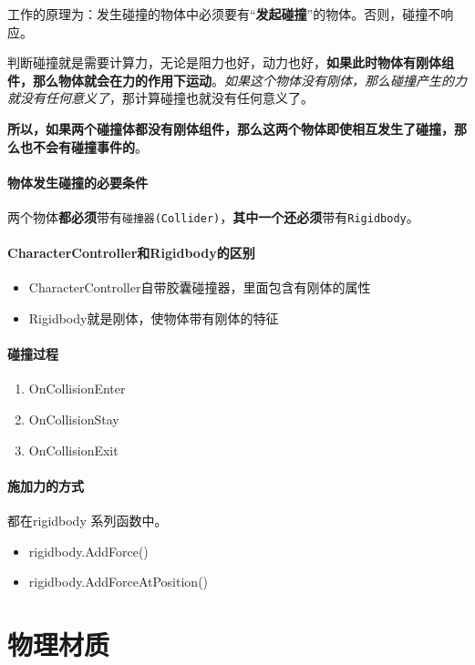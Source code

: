 \documentclass[UTF8,a4paper,12pt]{ctexbook}
\begin{document}
		工作的原理为：发生碰撞的物体中必须要有“\textbf{发起碰撞}”的物体。否则，碰撞不响应。
		
		判断碰撞就是需要计算力，无论是阻力也好，动力也好，\textbf{如果此时物体有刚体组件，那么物体就会在力的作用下运动}。\textit{如果这个物体没有刚体，那么碰撞产生的力就没有任何意义了}，那计算碰撞也就没有任何意义了。
		
		\textbf{所以，如果两个碰撞体都没有刚体组件，那么这两个物体即使相互发生了碰撞，那么也不会有碰撞事件的}。

		\paragraph{物体发生碰撞的必要条件}
			两个物体\textbf{都必须}带有\verb|碰撞器(Collider)|，\textbf{其中一个}\textbf{还必须}带有\verb|Rigidbody|。
		
		\paragraph{CharacterController和Rigidbody的区别}
			\begin{itemize}
				\item CharacterController自带胶囊碰撞器，里面包含有刚体的属性
				\item Rigidbody就是刚体，使物体带有刚体的特征
			\end{itemize}
	
		\paragraph{碰撞过程}
			\begin{enumerate}
				\item OnCollisionEnter
				\item OnCollisionStay
				\item OnCollisionExit
			\end{enumerate}
		
		\paragraph{施加力的方式}都在rigidbody 系列函数中。
			\begin{itemize}
				\item rigidbody.AddForce()
				\item rigidbody.AddForceAtPosition()
			\end{itemize}	
			
	\section{物理材质}
	
\end{document}
